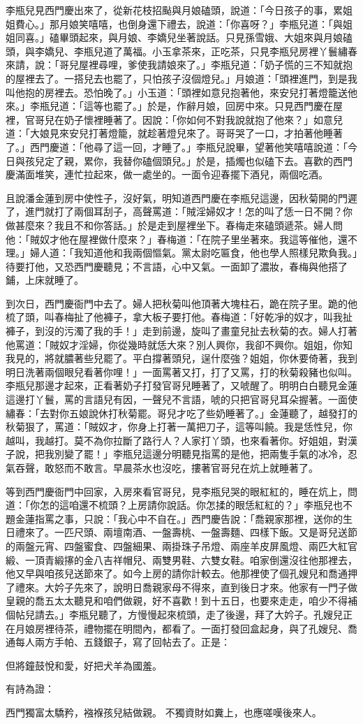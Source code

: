 李瓶兒見西門慶出來了，從新花枝招颭與月娘磕頭，說道：「今日孩子的事，累姐姐費心。」那月娘笑嘻嘻，也倒身還下禮去，說道：「你喜呀？」李瓶兒道：「與姐姐同喜。」磕畢頭起來，與月娘、李嬌兒坐著說話。只見孫雪娥、大姐來與月娘磕頭，與李嬌兒、李瓶兒道了萬福。小玉拿茶來，正吃茶，只見李瓶兒房裡丫鬟繡春來請，說：「哥兒屋裡尋哩，爹使我請娘來了。」李瓶兒道：「奶子慌的三不知就抱的屋裡去了。一搭兒去也罷了，只怕孩子沒個燈兒。」月娘道：「頭裡進門，到是我叫他抱的房裡去。恐怕晚了。」小玉道：「頭裡如意兒抱著他，來安兒打著燈籠送他來。」李瓶兒道：「這等也罷了。」於是，作辭月娘，回房中來。只見西門慶在屋裡，官哥兒在奶子懷裡睡著了。因說：「你如何不對我說就抱了他來？」如意兒道：「大娘見來安兒打著燈籠，就趁著燈兒來了。哥哥哭了一口，才拍著他睡著了。」西門慶道：「他尋了這一回，才睡了。」李瓶兒說畢，望著他笑嘻嘻說道：「今日與孩兒定了親，累你，我替你磕個頭兒。」於是，插燭也似磕下去。喜歡的西門慶滿面堆笑，連忙拉起來，做一處坐的。一面令迎春擺下酒兒，兩個吃酒。

且說潘金蓮到房中使性子，沒好氣，明知道西門慶在李瓶兒這邊，因秋菊開的門遲了，進門就打了兩個耳刮子，高聲罵道：「賊淫婦奴才！怎的叫了恁一日不開？你做甚麼來？我且不和你答話。」於是走到屋裡坐下。春梅走來磕頭遞茶。婦人問他：「賊奴才他在屋裡做什麼來？」春梅道：「在院子里坐著來。我這等催他，還不理。」婦人道：「我知道他和我兩個慪氣。黨太尉吃匾食，他也學人照樣兒欺負我。」待要打他，又恐西門慶聽見；不言語，心中又氣。一面卸了濃妝，春梅與他搭了鋪，上床就睡了。

到次日，西門慶衙門中去了。婦人把秋菊叫他頂著大塊柱石，跪在院子里。跪的他梳了頭，叫春梅扯了他褲子，拿大板子要打他。春梅道：「好乾凈的奴才，叫我扯褲子，到沒的污濁了我的手！」走到前邊，旋叫了畫童兒扯去秋菊的衣。婦人打著他罵道：「賊奴才淫婦，你從幾時就恁大來？別人興你，我卻不興你。姐姐，你知我見的，將就膿著些兒罷了。平白撐著頭兒，逞什麼強？姐姐，你休要倚著，我到明日洗著兩個眼兒看著你哩！」一面罵著又打，打了又罵，打的秋菊殺豬也似叫。李瓶兒那邊才起來，正看著奶子打發官哥兒睡著了，又唬醒了。明明白白聽見金蓮這邊打丫鬟，罵的言語兒有因，一聲兒不言語，唬的只把官哥兒耳朵握著。一面使繡春：「去對你五娘說休打秋菊罷。哥兒才吃了些奶睡著了。」金蓮聽了，越發打的秋菊狠了，罵道：「賊奴才，你身上打著一萬把刀子，這等叫饒。我是恁性兒，你越叫，我越打。莫不為你拉斷了路行人？人家打丫頭，也來看著你。好姐姐，對漢子說，把我別變了罷！」李瓶兒這邊分明聽見指罵的是他，把兩隻手氣的冰冷，忍氣吞聲，敢怒而不敢言。早晨茶水也沒吃，摟著官哥兒在炕上就睡著了。

等到西門慶衙門中回家，入房來看官哥兒，見李瓶兒哭的眼紅紅的，睡在炕上，問道：「你怎的這咱還不梳頭？上房請你說話。你怎揉的眼恁紅紅的？」李瓶兒也不題金蓮指罵之事，只說：「我心中不自在。」西門慶告說：「喬親家那裡，送你的生日禮來了。一匹尺頭、兩壇南酒、一盤壽桃、一盤壽麵、四樣下飯。又是哥兒送節的兩盤元宵、四盤蜜食、四盤細果、兩掛珠子吊燈、兩座羊皮屏風燈、兩匹大紅官緞、一頂青緞㩟的金八吉祥帽兒、兩雙男鞋、六雙女鞋。咱家倒還沒往他那裡去，他又早與咱孩兒送節來了。如今上房的請你計較去。他那裡使了個孔嫂兒和喬通押了禮來。大妗子先來了，說明日喬親家母不得來，直到後日才來。他家有一門子做皇親的喬五太太聽見和咱們做親，好不喜歡！到十五日，也要來走走，咱少不得補個帖兒請去。」李瓶兒聽了，方慢慢起來梳頭，走了後邊，拜了大妗子。孔嫂兒正在月娘房裡待茶，禮物擺在明間內，都看了。一面打發回盒起身，與了孔嫂兒、喬通每人兩方手帕、五錢銀子，寫了回帖去了。正是：

但將鐘鼓悅和愛，好把犬羊為國羞。

有詩為證：

西門獨富太驕矜，襁褓孩兒結做親。
不獨資財如糞上，也應嗟嘆後來人。

